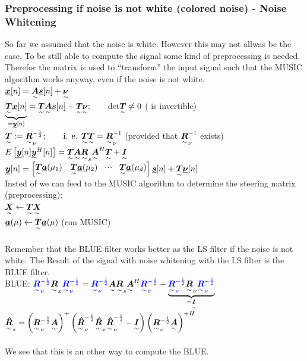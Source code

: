 \subsubsection{Preprocessing if noise is not white (colored noise) - Noise Whitening}
So far we assumed that the noise is white. However this may not allwas be the case. To be still able to compute the signal some kind of preprocessing is needed. Therefor the matrix  is used to ``transform'' the input signal such that the MUSIC algorithm works anyway, even if the noise is not white.\\
$\vec{x}[n]=\ma{A}\vec{s}[n]+\ma{\nu}$\\
$\underbrace{\ma{T}\vec{x}[n]}_{=\vec{y}[n]}=\ma{T}\ma{A}\vec{s}[n]+\ma{T}\ma{\nu};\qquad \text{det}\ma{T}\neq 0$ ( is invertible)\\
$\ma{T}:=\ma{R}_\nu^{-\frac{1}{2}};\qquad \text{i. e. } \ma{T}\ma{T}=\ma{R}_\nu^{-1}$ (provided that $\ma{R}_\nu^{-1}$ exists)\\
$E\left[\vec{y}[n]\vec{y}^H[n]\right]=\ma{T}\ma{A}\ma{R}_s\ma{A}^H\ma{T}+\ma{I}$\\
$\vec{y}[n]=\mat{\ma{T}\vec{a}(\mu_1)&\ma{T}\vec{a}(\mu_2)&\shdots&\ma{T}\vec{a}(\mu_d)}\vec{s}[n]+\ma{T}\vec{\nu}[n]$\\
Insted of  we can feed  to the MUSIC algorithm to determine the steering matrix (preprocessing):\\
$\ma{X}\leftarrow\ma{T}\ma{X}$\\
$\vec{a}(\mu)\leftarrow\ma{T}\vec{a}(\mu)$ (run MUSIC)\\ \\
\Ra Remember that the BLUE filter works better as the LS filter if the noise is not white. The Result of the signal with noise whitening with the LS filter is the BLUE filter. \\

BLUE: $\textcolor[rgb]{0,0,1}{\ma{R}_\nu^{-\frac{1}{2}}}\ma{R}_x\textcolor[rgb]{0,0,1}{\ma{R}_\nu^{-\frac{1}{2}}}=\textcolor[rgb]{0,0,1}{\ma{R}_\nu^{-\frac{1}{2}}}\ma{A}\ma{R}_s\ma{A}^H\textcolor[rgb]{0,0,1}{\ma{R}_\nu^{-\frac{1}{2}}}+\underbrace{\textcolor[rgb]{0,0,1}{\ma{R}_\nu^{-\frac{1}{2}}}\ma{R}_\nu\textcolor[rgb]{0,0,1}{\ma{R}_\nu^{-\frac{1}{2}}}}_{=\ma{I}}$\\
$\ma{\hat{R}}_s=\left(\ma{R}_\nu^{-\frac{1}{2}}\ma{A}\right)^+\left(\ma{\hat{R}}_\nu^{-\frac{1}{2}}\ma{\hat{R}}_x\ma{\hat{R}}_\nu^{-\frac{1}{2}}-\ma{I}\right)\left(\ma{R}_\nu^{-\frac{1}{2}}\ma{A}\right)^{+H}$\\ \\
\Ra We see that this is an other way to compute the BLUE.

